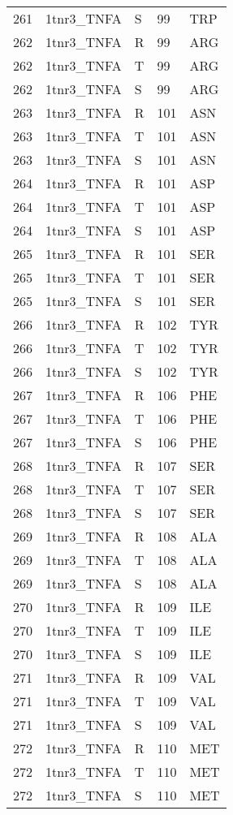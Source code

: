 \begin{tiny}
\begin{longtable}[l]{l|l|l|l|l}
	261 & 1tnr3\_TNFA & S & 99 & TRP \\
	262 & 1tnr3\_TNFA & R & 99 & ARG \\
	262 & 1tnr3\_TNFA & T & 99 & ARG \\
	262 & 1tnr3\_TNFA & S & 99 & ARG \\
	263 & 1tnr3\_TNFA & R & 101 & ASN \\
	263 & 1tnr3\_TNFA & T & 101 & ASN \\
	263 & 1tnr3\_TNFA & S & 101 & ASN \\
	264 & 1tnr3\_TNFA & R & 101 & ASP \\
	264 & 1tnr3\_TNFA & T & 101 & ASP \\
	264 & 1tnr3\_TNFA & S & 101 & ASP \\
	265 & 1tnr3\_TNFA & R & 101 & SER \\
	265 & 1tnr3\_TNFA & T & 101 & SER \\
	265 & 1tnr3\_TNFA & S & 101 & SER \\
	266 & 1tnr3\_TNFA & R & 102 & TYR \\
	266 & 1tnr3\_TNFA & T & 102 & TYR \\
	266 & 1tnr3\_TNFA & S & 102 & TYR \\
	267 & 1tnr3\_TNFA & R & 106 & PHE \\
	267 & 1tnr3\_TNFA & T & 106 & PHE \\
	267 & 1tnr3\_TNFA & S & 106 & PHE \\
	268 & 1tnr3\_TNFA & R & 107 & SER \\
	268 & 1tnr3\_TNFA & T & 107 & SER \\
	268 & 1tnr3\_TNFA & S & 107 & SER \\
	269 & 1tnr3\_TNFA & R & 108 & ALA \\
	269 & 1tnr3\_TNFA & T & 108 & ALA \\
	269 & 1tnr3\_TNFA & S & 108 & ALA \\
	270 & 1tnr3\_TNFA & R & 109 & ILE \\
	270 & 1tnr3\_TNFA & T & 109 & ILE \\
	270 & 1tnr3\_TNFA & S & 109 & ILE \\
	271 & 1tnr3\_TNFA & R & 109 & VAL \\
	271 & 1tnr3\_TNFA & T & 109 & VAL \\
	271 & 1tnr3\_TNFA & S & 109 & VAL \\
	272 & 1tnr3\_TNFA & R & 110 & MET \\
	272 & 1tnr3\_TNFA & T & 110 & MET \\
	272 & 1tnr3\_TNFA & S & 110 & MET \\

\end{longtable}
\end{tiny}
